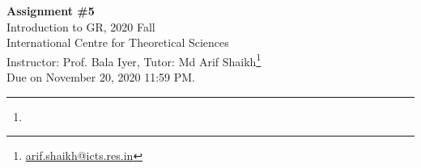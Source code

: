 \documentclass{article}
\begin{document}
\begin{center}
  {\bfseries Assignment \#5}\\
  Introduction to GR, 2020 Fall\\
  International Centre for Theoretical Sciences\\
  Instructor: Prof. Bala Iyer, Tutor: Md Arif Shaikh\footnote{\href{mailto: arif.shaikh@icts.res.in}{arif.shaikh@icts.res.in}}\\
  Due on November 20, 2020 11:59 PM.
\end{center}
\hrule

\begin{enumerate}
\item 
\end{enumerate}
\end{document}
